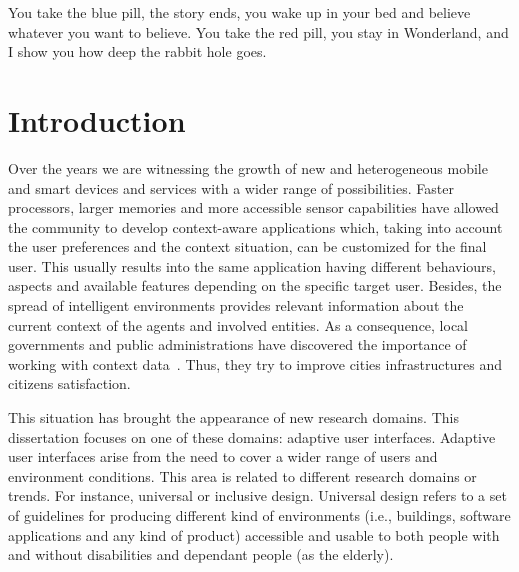 \begin{savequote}[50mm]
You take the blue pill, the story ends, you wake up in your bed and believe 
whatever you want to believe. You take the red pill, you stay in Wonderland, 
and I show you how deep the rabbit hole goes.
\end{savequote}

\chapter{Introduction}
\label{cha:introduction}

\ifpdf
    \graphicspath{{1_introduction/figures/PNG/}{1_introduction/figures/PDF/}{1_introduction/figures/}}
\else
    \graphicspath{{1_introduction/figures/EPS/}{1_introduction/figures/}}
\fi


Over the years we are witnessing the growth of new and heterogeneous mobile and
smart devices and services with a wider range of possibilities. Faster processors,
larger memories and more accessible sensor capabilities have allowed the community to
develop context-aware applications which, taking into account the user preferences
and the context situation, can be customized for the final user. This usually
results into the same application having different behaviours, aspects and 
available features depending on the specific target user. Besides, the spread 
of intelligent environments provides relevant information about the current 
context of the agents and involved entities. As a consequence, local 
governments and public administrations have discovered the importance of 
working with context data~\citep{caragliu_smart_2009}. Thus, they try to 
improve cities infrastructures and citizens satisfaction.

This situation has brought the appearance of new research domains. This 
dissertation focuses on one of these domains: adaptive user interfaces. 
Adaptive user interfaces arise from the need to cover a wider range of users 
and environment conditions. This area is related to different research domains 
or trends. For instance, universal or inclusive design. Universal design refers 
to a set of guidelines for producing different kind of environments (i.e., 
buildings, software applications and any kind of product) accessible and usable 
to both people with and without disabilities and dependant people (as the 
elderly).


